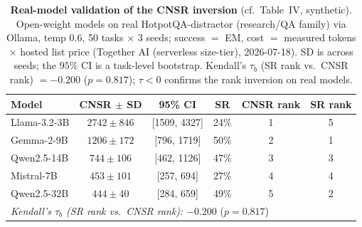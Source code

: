 \begin{table}[t]
\centering
\caption{\textbf{Real-model validation of the CNSR inversion} (cf.\ Table~IV, synthetic). Open-weight models on real HotpotQA-distractor (research/QA family) via Ollama, temp 0.6, 50 tasks $\times$ 3 seeds; success $=$ EM, cost $=$ measured tokens $\times$ hosted list price (Together AI (serverless size-tier), 2026-07-18). SD is across seeds; the $95\%$ CI is a task-level bootstrap. Kendall's $\tau_b$ (SR rank vs.\ CNSR rank) $=-0.200$ ($p=0.817$); $\tau<0$ confirms the rank inversion on real models.}
\label{tab:cnsr_ollama_real}
\begin{tabular}{lccccc}
\toprule
Model & CNSR $\pm$ SD & 95\% CI & SR & CNSR rank & SR rank \\
\midrule
Llama-3.2-3B & $2742 \pm 846$ & [1509, 4327] & 24\% & 1 & 5 \\
Gemma-2-9B & $1206 \pm 172$ & [796, 1719] & 50\% & 2 & 1 \\
Qwen2.5-14B & $744 \pm 106$ & [462, 1126] & 47\% & 3 & 3 \\
Mistral-7B & $453 \pm 101$ & [257, 694] & 27\% & 4 & 4 \\
Qwen2.5-32B & $444 \pm 40$ & [284, 659] & 49\% & 5 & 2 \\
\midrule
\multicolumn{6}{l}{\textit{Kendall's $\tau_b$ (SR rank vs.\ CNSR rank):} $-0.200$ ($p=0.817$)} \\
\bottomrule
\end{tabular}
\end{table}
